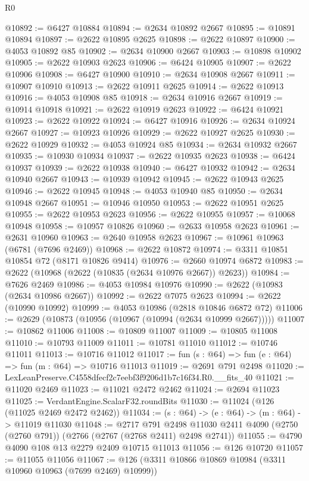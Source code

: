 \begin{lexlean}{R0}
\begin{coremodule}
@10892 := @6427 @10884
@10894 := @2634 @10892 @2667
@10895 := @10891 @10894
@10897 := @2622 @10895 @2625
@10898 := @2622 @10897
@10900 := @4053 @10892 @85
@10902 := @2634 @10900 @2667
@10903 := @10898 @10902
@10905 := @2622 @10903 @2623
@10906 := @6424 @10905
@10907 := @2622 @10906
@10908 := @6427 @10900
@10910 := @2634 @10908 @2667
@10911 := @10907 @10910
@10913 := @2622 @10911 @2625
@10914 := @2622 @10913
@10916 := @4053 @10908 @85
@10918 := @2634 @10916 @2667
@10919 := @10914 @10918
@10921 := @2622 @10919 @2623
@10922 := @6424 @10921
@10923 := @2622 @10922
@10924 := @6427 @10916
@10926 := @2634 @10924 @2667
@10927 := @10923 @10926
@10929 := @2622 @10927 @2625
@10930 := @2622 @10929
@10932 := @4053 @10924 @85
@10934 := @2634 @10932 @2667
@10935 := @10930 @10934
@10937 := @2622 @10935 @2623
@10938 := @6424 @10937
@10939 := @2622 @10938
@10940 := @6427 @10932
@10942 := @2634 @10940 @2667
@10943 := @10939 @10942
@10945 := @2622 @10943 @2625
@10946 := @2622 @10945
@10948 := @4053 @10940 @85
@10950 := @2634 @10948 @2667
@10951 := @10946 @10950
@10953 := @2622 @10951 @2625
@10955 := @2622 @10953 @2623
@10956 := @2622 @10955
@10957 := @10068 @10948
@10958 := @10957 @10826
@10960 := @2633 @10958 @2623
@10961 := @2631 @10960
@10963 := @2640 @10958 @2623
@10967 := @10961 @10963 (@6781 (@7696 @2469))
@10968 := @2622 @10872
@10974 := @3311 @10851 @10854 @72 (@8171 @10826 @9414)
@10976 := @2660 @10974 @6872
@10983 := @2622 (@10968 (@2622 (@10835 (@2634 @10976 @2667)) @2623))
@10984 := @7626 @2469
@10986 := @4053 @10984 @10976
@10990 := @2622 (@10983 (@2634 @10986 @2667))
@10992 := @2622 @7075 @2623
@10994 := @2622 (@10990 @10992)
@10999 := @4053 @10986 (@2818 @10846 @6872 @72)
@11006 := @2629 (@10873 (@10956 (@10967 (@10994 (@2634 @10999 @2667)))))
@11007 := @10862 @11006
@11008 := @10809 @11007
@11009 := @10805 @11008
@11010 := @10793 @11009
@11011 := @10781 @11010
@11012 := @10746 @11011
@11013 := @10716 @11012
@11017 := fun (s : @64) => fun (e : @64) => fun (m : @64) => @10716 @11013
@11019 := @2691 @791 @2498
@11020 := LexLeanPreserve.C4558dfecf2c7eebf3f9206d1b7c16f34.R0.__fits_40
@11021 := @11020 @2469
@11023 := @11021 @2472 @2462
@11024 := @2694 @11023
@11025 := VerdantEngine.ScalarF32.roundBits
@11030 := @11024 (@126 (@11025 @2469 @2472 @2462))
@11034 := (s : @64) -> (e : @64) -> (m : @64) -> @11019 @11030
@11048 := @2717
    @791
    @2498
    @11030
    @2411
    @4090
    (@2750 (@2760 @791))
    (@2766 (@2767 (@2768 @2411) @2498 @2741))
@11055 := @4790 @4090 @108 @13 @2279 @2409 @10715 @11013
@11056 := @126 @10720
@11057 := @11055 @11056
@11067 := @126 (@3311 @10866 @10869 @10984 (@3311 @10960 @10963 (@7699 @2469) @10999))

\end{coremodule}
\end{lexlean}
